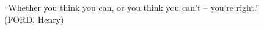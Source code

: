\begin{epigrafe}
	\vspace*{\fill}
	{%
		\noindent\hspace{.5\textwidth}
		{\begin{minipage}{.5\textwidth}
				\begin{flushright}
					``Whether you think you can, or you think you can't -- you're right.'' \\ (FORD, Henry)
				\end{flushright}
			\end{minipage}}%
		\vspace*{3cm}
	}%
\end{epigrafe}
